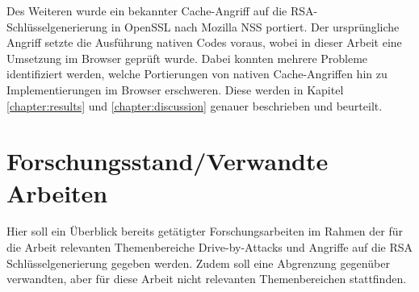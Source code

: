 Des Weiteren wurde ein bekannter Cache-Angriff auf die RSA-Schlüsselgenerierung in OpenSSL nach Mozilla NSS portiert.
Der ursprüngliche Angriff setzte die Ausführung nativen Codes voraus, wobei in dieser Arbeit eine Umsetzung im Browser geprüft wurde.
Dabei konnten mehrere Probleme identifiziert werden, welche Portierungen von nativen Cache-Angriffen hin zu Implementierungen im Browser erschweren. 
Diese werden in Kapitel \ref{chapter:results} und \ref{chapter:discussion} genauer beschrieben und beurteilt.

\section{Forschungsstand/Verwandte Arbeiten}
\label{related_work}

Hier soll ein Überblick bereits getätigter Forschungsarbeiten im Rahmen der für die Arbeit relevanten Themenbereiche %
Drive-by-Attacks 
und Angriffe auf die RSA Schlüsselgenerierung gegeben werden. Zudem soll eine Abgrenzung gegenüber verwandten, aber für diese Arbeit nicht relevanten Themenbereichen stattfinden.



